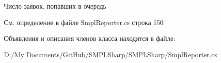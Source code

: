 Число заявок, попавших в очередь 



См. определение в файле Smpl\-Reporter.\-cs строка 150



Объявления и описания членов класса находятся в файле\-:\begin{DoxyCompactItemize}
\item 
D\-:/\-My Documents/\-Git\-Hub/\-S\-M\-P\-L\-Sharp/\-S\-M\-P\-L\-Sharp/Smpl\-Reporter.\-cs\end{DoxyCompactItemize}
